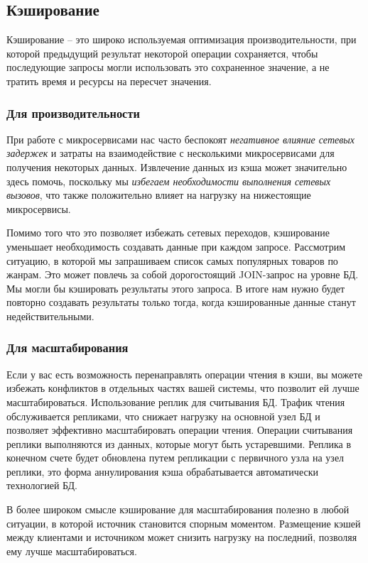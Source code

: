 \documentclass[%
	11pt,
	a4paper,
	utf8,
		]{article}
\begin{document}
\subsection{Кэширование}

Кэширование -- это широко используемая оптимизация производительности, при которой предыдущий результат некоторой операции сохраняется, чтобы последующие запросы могли использовать это сохраненное значение, а не тратить время и ресурсы на пересчет значения.

\subsubsection{Для производительности}

При работе с микросервисами нас часто беспокоят \emph{негативное влияние сетевых задержек} и затраты на взаимодействие с несколькими микросервисами для получения некоторых данных. Извлечение данных из кэша может значительно здесь помочь, поскольку мы \emph{избегаем необходимости выполнения сетевых вызовов}, что также положительно влияет на нагрузку на нижестоящие микросервисы.

Помимо того что это позволяет избежать сетевых переходов, кэширование уменьшает необходимость создавать данные при каждом запросе. Рассмотрим ситуацию, в которой мы запрашиваем список самых популярных товаров по жанрам. Это может повлечь за собой дорогостоящий JOIN-запрос на уровне БД. Мы могли бы кэшировать результаты этого запроса. В итоге нам нужно будет повторно создавать результаты только тогда, когда кэшированные данные станут недействительными.

\subsubsection{Для масштабирования}

Если у вас есть возможность перенаправлять операции чтения в кэши, вы можете избежать конфликтов в отдельных частях вашей системы, что позволит ей лучше масштабироваться. Использование реплик для считывания БД. Трафик чтения обслуживается репликами, что снижает нагрузку на основной узел БД и позволяет эффективно масштабировать операции чтения. Операции считывания реплики выполняются из данных, которые могут быть устаревшими. Реплика в конечном счете будет обновлена путем репликации с первичного узла на узел реплики, это форма аннулирования кэша обрабатывается автоматически технологией БД.

В более широком смысле кэширование для масштабирования полезно в любой ситуации, в которой источник становится спорным моментом. Размещение кэшей между клиентами и источником может снизить нагрузку на последний, позволяя ему лучше масштабироваться.
\end{document}
